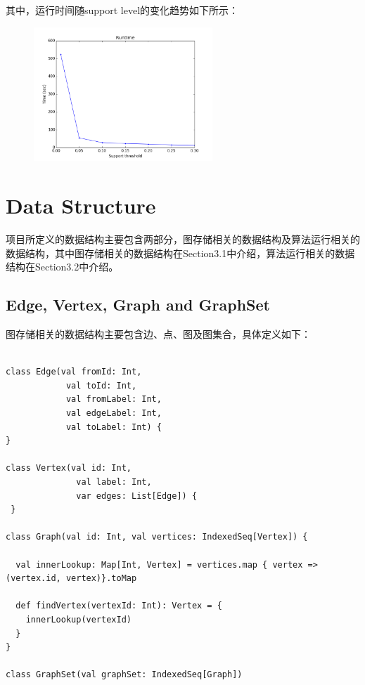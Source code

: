 \documentclass{article}
\begin{document}
其中，运行时间随support level的变化趋势如下所示：

\begin{figure}
  \centering

  \includegraphics[width=0.6\textwidth]{time.png} 
\end{figure}


\section{Data Structure}

项目所定义的数据结构主要包含两部分，图存储相关的数据结构及算法运行相关的数据结构，其中图存储相关的数据结构在Section3.1中介绍，算法运行相关的数据结构在Section3.2中介绍。

\subsection{Edge, Vertex, Graph and GraphSet}

图存储相关的数据结构主要包含边、点、图及图集合，具体定义如下：
\begin{lstlisting}[style=mStyle]

class Edge(val fromId: Int, 
            val toId: Int, 
            val fromLabel: Int, 
            val edgeLabel: Int, 
            val toLabel: Int) {
}

class Vertex(val id: Int, 
              val label: Int, 
              var edges: List[Edge]) {
 }

class Graph(val id: Int, val vertices: IndexedSeq[Vertex]) {

  val innerLookup: Map[Int, Vertex] = vertices.map { vertex => (vertex.id, vertex)}.toMap

  def findVertex(vertexId: Int): Vertex = {
    innerLookup(vertexId)
  }
}

class GraphSet(val graphSet: IndexedSeq[Graph])
\end{lstlisting}
\end{document}
